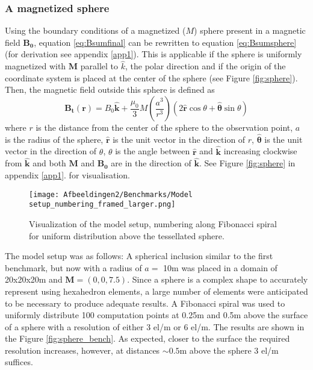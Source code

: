 \subsubsection{A magnetized sphere}
Using the boundary conditions of a magnetized ($M$) sphere present in a magnetic field $\mathbf{B_0}$, equation \ref{eq:Bsumfinal} can be rewritten to equation \ref{eq:Bsumsphere} (for derivation see appendix \ref{app1}). This is applicable if the sphere is uniformly magnetized with $\mathbf{M}$ parallel to $\hat{k}$, the polar direction and if the origin of the coordinate system is placed at the center of the sphere (see Figure \ref{fig:sphere}). Then, the magnetic field outside this sphere is defined as \parencite{REITZ}
\begin{equation}
    \label{eq:Bsumsphere}
    \mathbf{B_t(r)} =  B_0\mathbf{\hat{k}} + \frac{\mu_{0}}{3}M\left(\frac{a^3}{r^3}\right) \left(2\mathbf{\hat{r}}\cos{\theta}+\mathbf{{\hat{\theta}}}\sin{\theta}\right)
\end{equation}
where $r$ is the distance from the center of the sphere to the observation point, $a$ is the radius of the sphere, $\mathbf{\hat{r}}$ is the unit vector in the direction of $r$, $\mathbf{\hat{\theta}}$ is the unit vector in the direction of $\theta$, $\theta$ is the angle between $\mathbf{\hat{r}}$ and $\mathbf{\hat{k}}$ increasing clockwise from $\mathbf{\hat{k}}$ and both $\mathbf{M}$ and $\mathbf{B_0}$ are in the direction of $\mathbf{\hat{k}}$. See Figure \ref{fig:sphere} in appendix \ref{app1}. for visualisation.
\begin{figure}
  \centering
        \texttt{[image: Afbeeldingen2/Benchmarks/Model setup\_numbering\_framed\_larger.png]}
    \caption{Visualization of the model setup, numbering along Fibonacci spiral for uniform distribution above the tessellated sphere.}
  \label{fig:sphere_bench_setup}
\end{figure}
The model setup was as follows: A spherical inclusion similar to the first benchmark, but now with a radius of $a=$ 10m was placed in a domain of 20x20x20m and $\mathbf{M}= (0,0,7.5)$. Since a sphere is a complex shape to accurately represent using hexahedron elements, a large number of elements were anticipated to be necessary to produce adequate results. A Fibonacci spiral was used to uniformly distribute 100 computation points at 0.25m and 0.5m above the surface of a sphere with a resolution of either 3 el/m or 6 el/m. The results are shown in the Figure \ref{fig:sphere_bench}. As expected, closer to the surface the required resolution increases, however, at distances $\sim 0.5$m above the sphere 3 el/m suffices. 

